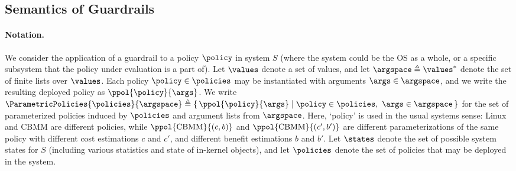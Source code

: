 

\iffalse


\subsection{Semantics of Guardrails}
\label{subsec:semantics}

\paragraph{Notation.}
We consider the application of a guardrail to a policy $\policy$ in system $S$ (where the system could be the OS as a whole, or a specific subsystem that the policy under evaluation is a part of).
Let $\values$ denote a set of values, and let $\argspace \triangleq \values^*$ denote the set of finite lists over $\values$.
Each policy $\policy \in \policies$ may be instantiated with arguments $\args \in \argspace$, and we write the resulting deployed policy as $\ppol{\policy}{\args}$.
We write
\(
\ParametricPolicies{\policies}{\argspace} \triangleq \{\, \ppol{\policy}{\args} \mid \policy \in \policies,\ \args \in \argspace \,\}
\)
for the set of parameterized policies induced by $\policies$ and argument lists from $\argspace$.
Here, `policy' is used in the usual systems sense: Linux and CBMM are different policies, while $\ppol{\mathrm{CBMM}}{(c,b)}$ and $\ppol{\mathrm{CBMM}}{(c',b')}$ are different parameterizations of the same policy with different cost estimations $c$ and $c'$, and different benefit estimations $b$ and $b'$.
Let $\states$ denote the set of possible system states for $S$ (including various statistics and state of in-kernel objects), and let $\policies$ denote the set of policies that may be deployed in the system.

